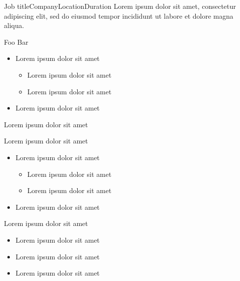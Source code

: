 \documentclass[10pt, a4paper]{article}
\begin{document}

\begin{cvitem}{Job title}{Company}{Location}{Duration}
Lorem ipsum dolor sit amet, consectetur adipiscing elit, sed do eiusmod tempor incididunt ut labore et dolore magna aliqua.
    \begin{itemcon}
        \item Foo Bar
	    \begin{itemize}
	        \item Lorem ipsum dolor sit amet
    	    \begin{itemize}
			    \item Lorem ipsum dolor sit amet
			    \item Lorem ipsum dolor sit amet
		    \end{itemize}
	        \item Lorem ipsum dolor sit amet
	    \end{itemize}
        \item Lorem ipsum dolor sit amet
        \item Lorem ipsum dolor sit amet
	    \begin{itemize}
	        \item Lorem ipsum dolor sit amet
    	    \begin{itemize}
			    \item Lorem ipsum dolor sit amet
			    \item Lorem ipsum dolor sit amet
		    \end{itemize}
	        \item Lorem ipsum dolor sit amet
	    \end{itemize}
        \item Lorem ipsum dolor sit amet
	    \begin{itemize}
	        \item Lorem ipsum dolor sit amet
	        \item Lorem ipsum dolor sit amet
	        \item Lorem ipsum dolor sit amet
	    \end{itemize}
	\item[\dottedlinked{white}]
    \end{itemcon}
\end{cvitem}
\end{document}

